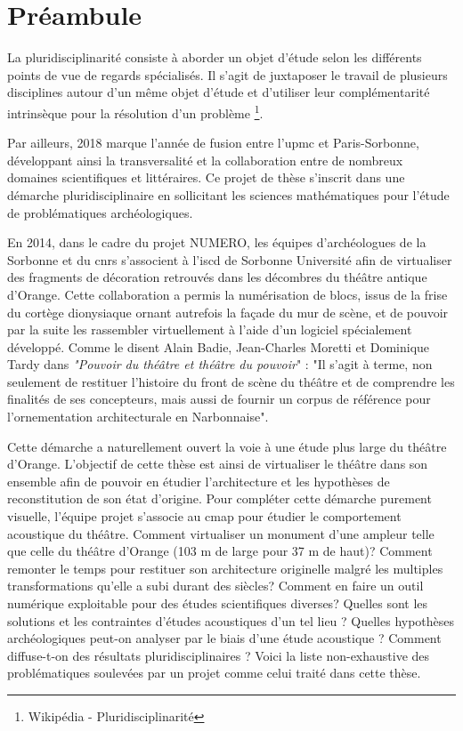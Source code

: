\chapter*{Préambule}
	
	
			
La pluridisciplinarité consiste à aborder un objet d'étude selon les différents points de vue de regards spécialisés. Il s'agit de juxtaposer le travail de plusieurs disciplines autour d'un même objet d'étude et d'utiliser leur complémentarité intrinsèque pour la résolution d'un problème \footnote{Wikipédia - Pluridisciplinarité}. 

Par ailleurs, 2018 marque l'année de fusion entre l'\gls{upmc} et Paris-Sorbonne, développant ainsi la transversalité et la collaboration entre de nombreux domaines scientifiques et littéraires. Ce projet de thèse s'inscrit dans une démarche pluridisciplinaire en sollicitant les sciences mathématiques pour l'étude de problématiques archéologiques.
						
En 2014, dans le cadre du projet NUMERO, les équipes d'archéologues de la Sorbonne et du \gls{cnrs} s'associent à l'\gls{iscd} de Sorbonne Université afin de virtualiser des fragments de décoration retrouvés dans les décombres du théâtre antique d'Orange. Cette collaboration a permis la numérisation de blocs, issus de la frise du cortège dionysiaque ornant autrefois la façade du mur de scène, et de pouvoir par la suite les rassembler virtuellement à l'aide d'un logiciel spécialement développé. Comme le disent Alain Badie, Jean-Charles Moretti et Dominique Tardy dans \textit{"Pouvoir du théâtre et théâtre du pouvoir}"\cite[p.32]{PouvoirDuTheatre} : "Il s'agit à terme, non seulement de restituer l'histoire du front de scène du théâtre et de comprendre les finalités de ses concepteurs, mais aussi de fournir un corpus de référence pour l'ornementation architecturale en Narbonnaise".
			
Cette démarche a naturellement ouvert la voie à une étude plus large du théâtre d'Or\-ange. L'objectif de cette thèse est ainsi de virtualiser le théâtre dans son ensemble afin de pouvoir en étudier l'architecture et les hypothèses de reconstitution de son état d'origine. Pour compléter cette démarche purement visuelle, l'équipe projet s'associe au \gls{cmap} pour étudier le comportement acoustique du théâtre. Comment virtualiser un monument d'une ampleur telle que celle du théâtre d'Orange (103 m de large pour 37 m de haut)? Comment remonter le temps pour restituer son architecture originelle malgré les multiples transformations qu'elle a subi durant des siècles? Comment en faire un outil numérique exploitable pour des études scientifiques diverses? Quelles sont les solutions et les contraintes d'études acoustiques d'un tel lieu ? Quelles hypothèses archéologiques peut-on analyser par le biais d'une étude acoustique ? Comment diffuse-t-on des résultats pluridisciplinaires ? Voici la liste non-exhaustive des problématiques soulevées par un projet comme celui traité dans cette thèse. 
			
